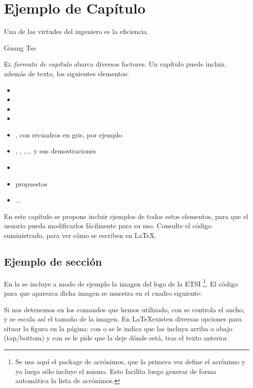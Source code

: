 
\chapter{Ejemplo de Capítulo}
\pagestyle{esitscCD}
\epigraph{ Una de las virtudes del ingeniero es la eficiencia.  }{Guang Tse}

\lettrine[lraise=-0.1, lines=2, loversize=0.25]{E}l \emph{formato de capítulo } abarca diversos factores. Un capítulo puede incluir, además de texto, los siguientes elementos:

\begin{itemize}\itemsep1pt \parskip0pt 
\item {}
\item {}
\item {}
\item {}
\item {}, con recuadros en gris, por ejemplo
\item {}, , ,... y sus demostraciones
\item {}
\item {} propuestos
\item ...
\end{itemize}

En este capítulo se propone incluir ejemplos de todos estos elementos, para que el usuario pueda modificarlos fácilmente para su uso. Consulte el código suministrado, para ver cómo se escriben en \LaTeX.

\section{Ejemplo de sección}
%
En la  se incluye a modo de ejemplo la imagen del logo de la \gls{ETSI} \footnote{Se usa aquí el package de acrónimos, que la primera vez define el acrónimo y ya luego sólo incluye el mismo. Esto facilita luego generar de forma automática la lista de acrónimos.}. El código para que aparezca dicha imagen se muestra en el cuadro siguiente:



Si nos detenemos en los comandos que hemos utilizado, con  se controla el ancho, y se escala así el tamaño de la imagen. En \LaTeX existen diversas opciones para situar la figura en la página: con  o  se le indica que las incluya arriba o abajo (top/bottom) y con \ttcolor{!} se le pide que la deje dónde está, tras el texto anterior.


